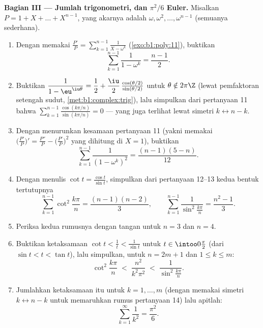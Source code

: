 \begin{problem}
\medskip
\noindent\textbf{Bagian III --- Jumlah trigonometri, dan $\pi^2/6$
Euler.} Misalkan $P = 1 + X + \dots + X^{n-1}$, yang akarnya adalah
$\omega, \omega^2, \dots, \omega^{n-1}$ (semuanya sederhana).
\begin{enumerate}[resume]
  \item Dengan memakai $\frac{P'}P = \sum_{k=1}^{n-1}\frac1{X - \omega^k}$
        (\cref{exo:b1:poly:11}), buktikan
        \[
        \sum_{k=1}^{n-1}\frac{1}{1 - \omega^k} = \frac{n-1}2 .
        \]
  \item Buktikan $\dfrac1{1 - \eu^{\iu\theta}} = \dfrac12 +
        \dfrac\iu2\,\frac{\cos(\theta/2)}{\sin(\theta/2)}$ untuk
        $\theta \notin 2\pi\Z$ (lewat pemfaktoran setengah sudut,
        \cref{met:b1:complex:trig}), lalu simpulkan dari pertanyaan 11
        bahwa $\sum_{k=1}^{n-1}
        \frac{\cos(k\pi/n)}{\sin(k\pi/n)} = 0$ --- yang juga terlihat
        lewat simetri $k \leftrightarrow n - k$.
  \item Dengan menurunkan kesamaan pertanyaan 11 (yakni memakai
        $\bigl(\frac{P'}P\bigr)' = \frac{P''}P -
        \bigl(\frac{P'}P\bigr)^2$ yang dihitung di $X = 1$), buktikan
        \[
        \sum_{k=1}^{n-1}\frac{1}{(1 - \omega^k)^2}
        = \frac{(n-1)(5-n)}{12} .
        \]
  \item Dengan menulis $\cot t = \frac{\cos t}{\sin t}$, simpulkan dari
        pertanyaan 12--13 kedua bentuk tertutupnya
        \[
        \sum_{k=1}^{n-1}\cot^2\frac{k\pi}n = \frac{(n-1)(n-2)}3,
        \qquad
        \sum_{k=1}^{n-1}\frac1{\sin^2\frac{k\pi}n}
        = \frac{n^2-1}3 .
        \]
  \item Periksa kedua rumusnya dengan tangan untuk $n = 3$ dan $n = 4$.
  \item Buktikan ketaksamaan $\cot t < \frac1t < \frac1{\sin t}$
        untuk $t \in \intoo0{\frac\pi2}$ (dari $\sin t < t < \tan
        t$), lalu simpulkan, untuk $n = 2m + 1$ dan $1 \leq k \leq m$:
        \[
        \cot^2\frac{k\pi}n \;<\; \frac{n^2}{k^2\pi^2}
        \;<\; \frac1{\sin^2\frac{k\pi}n} .
        \]
  \item Jumlahkan ketaksamaan itu untuk $k = 1, \dots, m$ (dengan memakai
        simetri $k \leftrightarrow n - k$ untuk memaruhkan rumus
        pertanyaan 14) lalu apitlah:
        \[
        \sum_{k=1}^{\infty}\frac1{k^2} = \frac{\pi^2}6 .
        \]
\end{enumerate}


\end{problem}
